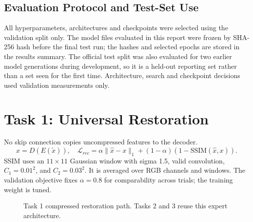 \documentclass[conference]{IEEEtran}
\begin{document}
\subsection{Evaluation Protocol and Test-Set Use}\label{sec:protocol}
All hyperparameters, architectures and checkpoints were selected using the
validation split only. The model files evaluated in this report were frozen by
SHA-256 hash before the final test run; the hashes and selected epochs are
stored in the results summary. The official test split was also evaluated for
two earlier model generations during development, so it is a held-out reporting
set rather than a set seen for the first time. Architecture, search and checkpoint
decisions used validation measurements only.

\section{Task 1: Universal Restoration}
No skip connection copies uncompressed features to the decoder.
\begin{equation}
\hat{x}=D(E(\tilde{x})),\quad
\mathcal{L}_{rec}=\alpha\|\hat{x}-x\|_1+(1-\alpha)(1-\mathrm{SSIM}(\hat{x},x)).
\end{equation}
SSIM uses an $11\times11$ Gaussian window with sigma 1.5, valid convolution,
$C_1=0.01^2$, and $C_2=0.03^2$. It is averaged over RGB channels and windows.
The validation objective fixes $\alpha=0.8$ for comparability across trials;
the training weight is tuned.
\begin{figure}[!ht]\centering
{}\caption{Task 1 compressed restoration path. Tasks 2 and 3 reuse this expert architecture.}\end{figure}
\end{document}
